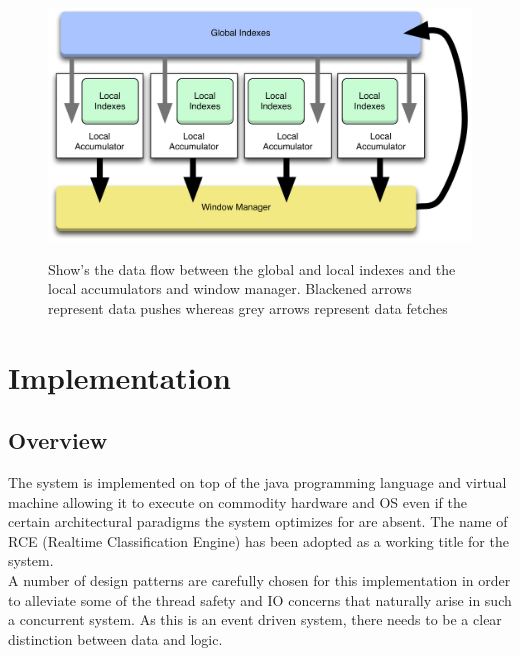 \documentclass[a4paper,11pt]{scrreprt}
\begin{document}
\begin{figure}[h!]
\centering
\caption{Show's the data flow between the global and local indexes and the local accumulators and window manager. Blackened arrows represent data pushes whereas grey arrows represent data fetches}
\includegraphics[scale=0.35, trim=0 0 0 12, clip=true] {indexes.pdf}
\label{fig:indexes}
\end{figure}

\chapter{Implementation}
\VerbatimFootnotes
\section{Overview}
The system is implemented on top of the java programming language and virtual machine allowing it to execute on commodity hardware and OS even if the certain architectural paradigms the system optimizes for are absent. The name of RCE (Realtime Classification Engine) has been adopted as a working title for the system. \\A number of design patterns are carefully chosen for this implementation in order to alleviate some of the thread safety and IO concerns that naturally arise in such a concurrent system. As this is an event driven system, there needs to be a clear distinction between data and logic. 
\end{document}
